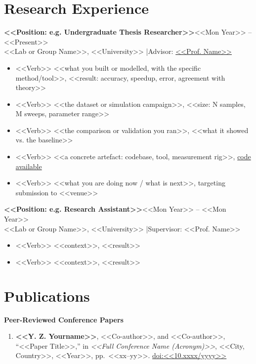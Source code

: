 \documentclass[a4paper,10pt]{article}
\newcommand{\entry}[2]{\textbf{#1}\hfill{#2}\\}
\begin{document}

\section{Research Experience}

\entry{<<Position: e.g. Undergraduate Thesis Researcher>>}{<<Mon Year>> -- <<Present>>}
<<Lab or Group Name>>, <<University>> \quad|\quad Advisor: \href{<<faculty page url>>}{<<Prof. Name>>}
\begin{itemize}
  \item <<Verb>> <<what you built or modelled, with the specific method/tool>>, <<result: accuracy, speedup, error, agreement with theory>>
  \item <<Verb>> <<the dataset or simulation campaign>>, <<size: N samples, M sweeps, parameter range>>
  \item <<Verb>> <<the comparison or validation you ran>>, <<what it showed vs. the baseline>>
  \item <<Verb>> <<a concrete artefact: codebase, tool, measurement rig>>, \href{<<repo url>>}{code available}
  \item <<Verb>> <<what you are doing now / what is next>>, targeting submission to <<venue>>
\end{itemize}

\vspace{4pt}
\entry{<<Position: e.g. Research Assistant>>}{<<Mon Year>> -- <<Mon Year>>}
<<Lab or Group Name>>, <<University>> \quad|\quad Supervisor: <<Prof. Name>>
\begin{itemize}
  \item <<Verb>> <<context>>, <<result>>
  \item <<Verb>> <<context>>, <<result>>
\end{itemize}

\section{Publications}
\textbf{Peer-Reviewed Conference Papers}
\begin{enumerate}[leftmargin=1.4em, itemsep=3pt]
  \item \textbf{<<Y. Z. Yourname>>}, <<Co-author>>, and <<Co-author>>,
        ``<<Paper Title>>,'' in \textit{<<Full Conference Name (Acronym)>>},
        <<City, Country>>, <<Year>>, pp.~<<xx--yy>>.
        \href{<<doi url>>}{doi:<<10.xxxx/yyyy>>}
\end{enumerate}
\end{document}
